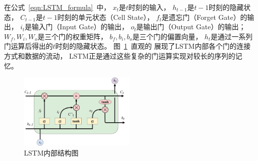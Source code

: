 在公式~\ref{eqn:LSTM_formula}~中，
$x_t$是$t$时刻的输入，
$h_{t-1}$是$t-1$时刻的隐藏状态，
$C_{t-1}$是$t-1$时刻的单元状态（Cell State），
$f_t$是遗忘门（Forget Gate）的输出，
$i_t$是输入门（Input Gate）的输出，
$o_t$是输出门（Output Gate）的输出；
$W_f, W_i, W_o$是三个门的权重矩阵，
$b_f, b_i, b_o$是三个门的偏置向量，
$h_t$是通过一系列门运算后得出的$t$时刻的隐藏状态。
图~\ref{fig:LSTM_structure}~直观的
展现了LSTM内部各个门的连接方式和数据的流动，
LSTM正是通过这些复杂的门运算实现对较长的序列的记忆。
\begin{figure}[H]
    \includegraphics[width=0.5\textwidth]{figure/drawio/LSTM_v9.pdf}
    \centering
    \caption{LSTM内部结构图}
    \label{fig:LSTM_structure}
\end{figure}

